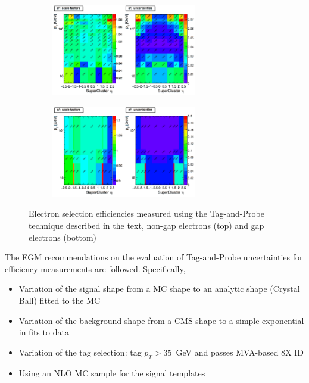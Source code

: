 \begin{figure}[tbh]
\centering
\begin{subfigure}{0.45\textwidth}
\centering
\includegraphics[width=2.5in]{Figures/Electrons/ele_eff_sf_unc.pdf}
\caption{}
\end{subfigure}
\begin{subfigure}{0.45\textwidth}
\centering
\includegraphics[width=2.5in]{Figures/Electrons/gap_ele_eff_sf_unc.pdf}
\caption{}
\end{subfigure}
\caption{Electron selection efficiencies measured using the Tag-and-Probe technique described in the text, non-gap electrons (top) and gap electrons (bottom)}
\label{fig:ele_sel_scale_factors}
\end{figure}



 The EGM recommendations on the evaluation of Tag-and-Probe uncertainties for efficiency measurements are followed. Specifically,

\begin{itemize}
   \item Variation of the signal shape from a MC shape to an analytic shape (Crystal Ball) fitted to the MC
   \item Variation of the background shape from a CMS-shape to a simple exponential in fits to data
   \item Variation of the tag selection: tag $p_{T}>$35~GeV and passes MVA-based 8X ID
   \item Using an NLO MC sample for the signal templates
\end{itemize}

